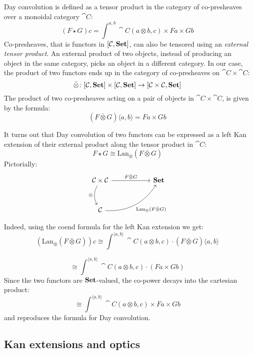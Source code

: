 \documentclass[DaoFP]{subfiles}
\begin{document}
Day convolution is defined as a tensor product in the category of co-presheaves over a monoidal category $\cat C$:
\[ (F \star G) c = \int^{a, b} \cat C (a \otimes b, c) \times F a \times G b \]
Co-presheaves, that is functors in $[\mathcal{C}, \mathbf{Set}]$, can also be tensored using an \emph{external tensor product}. An external product of two objects, instead of producing an object in the same category, picks an object in a different category. In our case, the product of two functors ends up in the category of co-presheaves on $\cat C \times \cat C$:
\[ \bar{\otimes} \colon [\mathcal{C}, \mathbf{Set}] \times [\mathcal{C}, \mathbf{Set}] \to [\mathcal{C} \times \mathcal{C}, \mathbf{Set}] \]
The product of two co-presheaves acting on a pair of objects in $\cat C \times \cat C$, is given by the formula:
\[ (F \bar{\otimes} G)\langle a, b \rangle = F a \times G b \]

It turns out that Day convolution of two functors can be expressed as a left Kan extension of their external product along the tensor product in $\cat C$:
\[ F \star G \cong \text{Lan}_{\otimes} (F \bar{ \otimes } G) \]
Pictorially:
\[
 \begin{tikzcd} [row sep=1cm, column sep=1cm]
 \cat C \times \cat C
 \arrow[rr, "F \bar{\otimes} G", "" {name=ID, below} ]
 \arrow[d, bend right, "\otimes"']
 && \Set
 \\
 \cat C
  \arrow[urr, bend right, "\text{Lan}_{\otimes} (F \bar{ \otimes } G)"']
 \end{tikzcd}
\]

Indeed, using the coend formula for the left Kan extension we get:
\[ (\text{Lan}_{\otimes} (F \bar{ \otimes } G)) c \cong \int^{\langle a, b\rangle} \cat C ( a \otimes b, c) \cdot (F \bar{ \otimes } G)\langle a, b\rangle\]

\[ \cong \int^{\langle a, b\rangle} \cat C ( a \otimes b, c) \cdot (F a \times G  b) \]
Since the two functors are $\mathbf{Set}$-valued, the co-power decays into the cartesian product:
\[ \cong \int^{\langle a, b\rangle} \cat C ( a \otimes b, c) \times F a \times G  b \]
and reproduces the formula for Day convolution.

\subsection{Kan extensions and optics}
\end{document}
